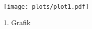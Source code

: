 \documentclass{scrartcl}
\begin{document}
  \begin{figure}
    \centering
    \texttt{[image: plots/plot1.pdf]}
    \caption{1. Grafik}
    \label{fig:1}
  \end{figure}
\end{document}

